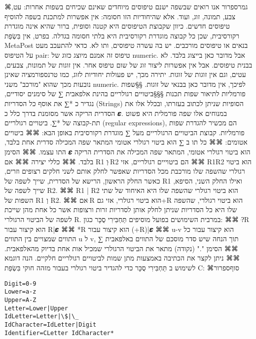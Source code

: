  ⌘גמר{ספרור}
      אנו רואים שבשפה ישנם טיפוסים מיוחדים שאינם שכיחים בשפות אחרות: עט, צבע,
      תמונה, זוג, ועוד. אלא שהיחודיות הזו חסומה: אין אפשרות למתכנת בשפה להוסיף
      טיפוסים חדשים. כיוון שקבוצת הטיפוסים היא קטנה וסופית, ברור שהיא אינה
      מוגדרת רקורסיבית, שכן כל קבוצה מוגדרת רקורסיבית היא בלתי חסומה בגדלה.
      בפרט, אין בִּשְׂפַת MetaPost בנאים או טיפוסים מורכבים. יש בה עשרה טיפוסים, ותו
      לא. כדאי להתעכב מעט על הטיפוס pair: טיפוס זה אמנם מיוצג כזוג של numeric.
      אבל מדובר כאן בייצוג בלבד. לא בבנית טיפוסים. אבל אין אפשרות ליצור זוג של
      שום טיפוס אחר. אין זוגות של תמונות, צבעים, עטים, וגם אין זוגות של זוגות.
      יתירה מכך, יש פעולות יחודיות לזוג, כמו טרנספורמציה שאינן נובעות מכך שהוא
      "מורכב" משני numeric. לפיכך, אין מדובר כאן בבנאי של זוגות.
      §§שפות פורמליות לתיאור שפות תכנות
      §§§ביטויים רגולריים
      בהינת אלפאבית ∑ של סימנים יסודיים, נגדיר כ *∑ את אוסף כל הסדריות (Strings) הסופיות שניתן לכתוב בעזרתו, ובכלל אלו את הסדרית הריקה אשר מסומנת בדרך כלל כ 𝜺. במנוחים אלו שפה פורמלית היא פשוט תת-קבוצה של *∑. ביטויים רגולריים (regular expressions), הם מכשיר להגדרת שפות פורמליות.
      קבוצת הביטויים הרגולריים מעל ∑ מוגדרת רקורסיבית באופן הבא:
      ⌘⌘ ביטויים אטומים:
      ⌘⌘ כל תו ב ∑ הוא ביטוי רגולרי אטומי המתאר שפה המכילה סדרית אחת בלבד, התו עצמו.
      ⌘⌘ הסימן 𝜺 הוא ביטוי רגולרי אטומי, המתאר שפה המכילה את הסדרית הריקה בלבד.
      ⌘⌘ כללי יצירה
      ⌘⌘ אם R1 וְ ּR2 הם ביטוייים רגולריים, אזי
      ⌘⌘ R1R2 הוא ביטוי רגולרי שהשפה שלו מורכבת מכל הסדריות שאפשר לחלק אותם לשני חלקים רצופים וזרים, כאשר החלק הראשון, הרישא של הסדרית, שייך לשפה של R1 ואילו החלק השני, הסיפא, שייך לשפה של R2.
      ⌘⌘ R1 | R2 הוא ביטוי רגולרי שהשפה שלו היא האיחוד של שתי השפות של R1 וְ R2.
      ⌘⌘ אם ּR הוא ביטוי רגולרי, אזי גם+R הוא ביטוי רגולרי, שהשפה שלו היא כל הסדריות שניתן לחלק אותן לסדריות זרות ורצופות אשר כל אחת מהן שייכת לשפה של הביטוי הרגולרי R.
      במרבית השימושים בפועל מוסיפים תַּחְבִּירִי סֻכָּר כגון:
      ⌘⌘ ?ּR הוא קיצור עבור R|𝜺
      ⌘⌘ *R הוא קיצור עבור (+R)|𝜺
      ⌘⌘ u-v הוא קיצור עבור כל התווים שמצויים בין התווים u ל v, תוך הנחה שיש סדר מוסכם של התווים באלפאבית ∑
      ⌘⌘ הסימן "." (נקודה) מתאר את הביטוי הרגולרי שמכיל אות אחת בדיוק מהאלפאבית.
      ⌘⌘ ניתן לקצר את הכתיבה באמצעות מתן שמות לביטויים רגולריים חלקיים.
      הנה דוגמא לשימוש ב תַּחְבִּירִי סֻכָּר כדי להגדיר ביטוי רגולרי בעבור מזהה חוקי בִּשְׂפַת C:
  ⌘סוף{ספרור}
\begin{verbatim}
Digit=0-9
Lower=a-z
Upper=A-Z
Letter=Lower|Upper
IdLetter=Letter|\$|\_
IdCharacter=IdLetter|Digit
Identifier=CLetter IdCharacter*
\end{verbatim}

